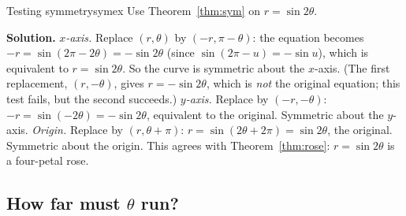 \documentclass[11pt]{article}
\begin{document}
\begin{exmp}{Testing symmetry}{symex}
Use Theorem~\ref{thm:sym} on $r=\sin2\theta$.

\textbf{Solution.} \emph{$x$-axis.} Replace $(r,\theta)$ by $(-r,\pi-\theta)$: the equation becomes $-r=\sin(2\pi-2\theta)=-\sin2\theta$ (since $\sin(2\pi-u)=-\sin u$), which is equivalent to $r=\sin2\theta$. So the curve is symmetric about the $x$-axis. (The first replacement, $(r,-\theta)$, gives $r=-\sin2\theta$, which is \emph{not} the original equation; this test fails, but the second succeeds.) \emph{$y$-axis.} Replace by $(-r,-\theta)$: $-r=\sin(-2\theta)=-\sin2\theta$, equivalent to the original. Symmetric about the $y$-axis. \emph{Origin.} Replace by $(r,\theta+\pi)$: $r=\sin(2\theta+2\pi)=\sin2\theta$, the original. Symmetric about the origin. This agrees with Theorem~\ref{thm:rose}: $r=\sin2\theta$ is a four-petal rose.
\end{exmp}

\subsection*{How far must $\theta$ run?}
\end{document}
